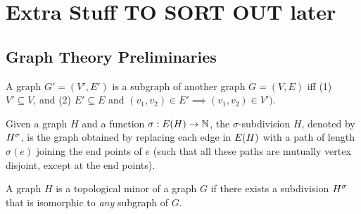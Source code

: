 \documentclass[11pt]{article}
\begin{document}


\clearpage
\appendix
\section{Extra Stuff TO SORT OUT later}
\subsection{Graph Theory Preliminaries}

\begin{definition}\label{def:dep-graphs}
	
\end{definition}




\begin{definition}[Subgraph]\label{def:subgraph}
A graph $G'=(V', E')$ is a subgraph of another graph $G=(V, E)$ iff (1) $V'\subseteq V$, and (2) $E'\subseteq E$ and  $(v_1, v_2) \in E' \implies (v_1, v_2) \in V')$.
	
\end{definition}

\begin{definition}\label{def:subdivisions}
Given a graph $H$ and a function $\sigma: E(H) \rightarrow \mathbb{N}$, the $\sigma$-subdivision $H$, denoted by ${H}^{\sigma}$, is the graph obtained by replacing each edge in $E(H)$ with a path of length $\sigma(e)$ joining the end points of $e$ (such that all these paths are mutually vertex disjoint, except at the end points).	
\end{definition}

\begin{definition}\label{def:topological-minor}
A graph $H$ is a topological minor of a graph $G$ if there exists a subdivision ${H}^{\sigma}$ that is isomorphic to \emph{any} subgraph of $G$.	
\end{definition}
\end{document}
